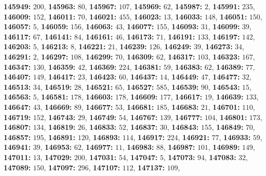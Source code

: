 \textsf{\bfseries 145949:} $200$, \textsf{\bfseries 145963:} $80$, \textsf{\bfseries 145967:} $107$, \textsf{\bfseries 145969:} $62$, \textsf{\bfseries 145987:} $2$, \textsf{\bfseries 145991:} $235$, \textsf{\bfseries 146009:} $152$, \textsf{\bfseries 146011:} $70$, \textsf{\bfseries 146021:} $455$, \textsf{\bfseries 146023:} $13$, \textsf{\bfseries 146033:} $148$, \textsf{\bfseries 146051:} $150$, \textsf{\bfseries 146057:} $5$, \textsf{\bfseries 146059:} $156$, \textsf{\bfseries 146063:} $43$, \textsf{\bfseries 146077:} $155$, \textsf{\bfseries 146093:} $31$, \textsf{\bfseries 146099:} $39$, \textsf{\bfseries 146117:} $67$, \textsf{\bfseries 146141:} $84$, \textsf{\bfseries 146161:} $46$, \textsf{\bfseries 146173:} $71$, \textsf{\bfseries 146191:} $133$, \textsf{\bfseries 146197:} $142$, \textsf{\bfseries 146203:} $5$, \textsf{\bfseries 146213:} $8$, \textsf{\bfseries 146221:} $21$, \textsf{\bfseries 146239:} $126$, \textsf{\bfseries 146249:} $39$, \textsf{\bfseries 146273:} $34$, \textsf{\bfseries 146291:} $2$, \textsf{\bfseries 146297:} $108$, \textsf{\bfseries 146299:} $70$, \textsf{\bfseries 146309:} $62$, \textsf{\bfseries 146317:} $103$, \textsf{\bfseries 146323:} $167$, \textsf{\bfseries 146347:} $130$, \textsf{\bfseries 146359:} $42$, \textsf{\bfseries 146369:} $224$, \textsf{\bfseries 146381:} $59$, \textsf{\bfseries 146383:} $62$, \textsf{\bfseries 146389:} $77$, \textsf{\bfseries 146407:} $149$, \textsf{\bfseries 146417:} $23$, \textsf{\bfseries 146423:} $60$, \textsf{\bfseries 146437:} $14$, \textsf{\bfseries 146449:} $47$, \textsf{\bfseries 146477:} $32$, \textsf{\bfseries 146513:} $34$, \textsf{\bfseries 146519:} $28$, \textsf{\bfseries 146521:} $65$, \textsf{\bfseries 146527:} $585$, \textsf{\bfseries 146539:} $90$, \textsf{\bfseries 146543:} $15$, \textsf{\bfseries 146563:} $5$, \textsf{\bfseries 146581:} $178$, \textsf{\bfseries 146603:} $178$, \textsf{\bfseries 146609:} $177$, \textsf{\bfseries 146617:} $19$, \textsf{\bfseries 146639:} $133$, \textsf{\bfseries 146647:} $43$, \textsf{\bfseries 146669:} $89$, \textsf{\bfseries 146677:} $53$, \textsf{\bfseries 146681:} $185$, \textsf{\bfseries 146683:} $21$, \textsf{\bfseries 146701:} $110$, \textsf{\bfseries 146719:} $152$, \textsf{\bfseries 146743:} $29$, \textsf{\bfseries 146749:} $54$, \textsf{\bfseries 146767:} $139$, \textsf{\bfseries 146777:} $104$, \textsf{\bfseries 146801:} $173$, \textsf{\bfseries 146807:} $134$, \textsf{\bfseries 146819:} $26$, \textsf{\bfseries 146833:} $52$, \textsf{\bfseries 146837:} $30$, \textsf{\bfseries 146843:} $155$, \textsf{\bfseries 146849:} $70$, \textsf{\bfseries 146857:} $195$, \textsf{\bfseries 146891:} $120$, \textsf{\bfseries 146893:} $114$, \textsf{\bfseries 146917:} $224$, \textsf{\bfseries 146921:} $77$, \textsf{\bfseries 146933:} $59$, \textsf{\bfseries 146941:} $39$, \textsf{\bfseries 146953:} $62$, \textsf{\bfseries 146977:} $11$, \textsf{\bfseries 146983:} $88$, \textsf{\bfseries 146987:} $101$, \textsf{\bfseries 146989:} $149$, \textsf{\bfseries 147011:} $13$, \textsf{\bfseries 147029:} $200$, \textsf{\bfseries 147031:} $54$, \textsf{\bfseries 147047:} $5$, \textsf{\bfseries 147073:} $94$, \textsf{\bfseries 147083:} $32$, \textsf{\bfseries 147089:} $150$, \textsf{\bfseries 147097:} $296$, \textsf{\bfseries 147107:} $112$, \textsf{\bfseries 147137:} $109$, 
